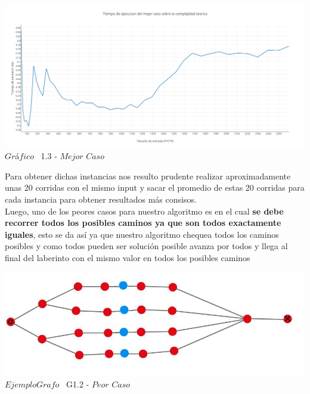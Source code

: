 \vspace*{0.3cm} \vspace*{0.3cm}
  \begin{center}
 \includegraphics[scale=0.65]{./EJ1/mejorcaso1.png}
 {$Gr$\'a$fico$ \ 1.3 - $Mejor$ $Caso$}
  \end{center}
  \vspace*{0.3cm}

 Para obtener dichas instancias nos resulto prudente realizar aproximadamente unas 20 corridas con el mismo input y sacar el promedio de estas 20 corridas para cada instancia para obtener resultados m\'as consisos.\\ 



Luego, uno de los peores casos para nuestro algoritmo es en el cual  \textbf{se debe recorrer todos los posibles caminos ya que son todos exactamente iguales}, esto se da as\'i ya que nuestro algoritmo chequea todos los caminos posibles y como todos pueden ser soluci\'on posible avanza por todos y llega al final del laberinto con el mismo valor en todos los posibles caminos\\

\vspace*{0.3cm} \vspace*{0.3cm}
  \begin{center}
\includegraphics[scale=0.65]{./EJ1/ej1grafopeorcaso.jpeg}
{$Ejemplo Grafo$ \ G1.2 - $Peor$ $Caso$}
  \end{center}
  \vspace*{0.3cm}

